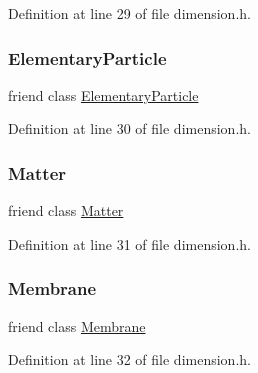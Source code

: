 Definition at line 29 of file dimension.\+h.

\mbox{\label{class_dimension_af2ace341c1d7ccd30de3502502773591}} 
\subsubsection{\texorpdfstring{Elementary\+Particle}{ElementaryParticle}}
{\footnotesize\ttfamily friend class \hyperlink{class_elementary_particle}{Elementary\+Particle}\hspace{0.3cm}{\ttfamily [friend]}}



Definition at line 30 of file dimension.\+h.

\mbox{\label{class_dimension_a01ab5ef28c10ff1c9ed0c618fa044aea}} 
\subsubsection{\texorpdfstring{Matter}{Matter}}
{\footnotesize\ttfamily friend class \hyperlink{class_matter}{Matter}\hspace{0.3cm}{\ttfamily [friend]}}



Definition at line 31 of file dimension.\+h.

\mbox{\label{class_dimension_ac790db405644a01723104c3c0c8128bb}} 
\subsubsection{\texorpdfstring{Membrane}{Membrane}}
{\footnotesize\ttfamily friend class \hyperlink{class_membrane}{Membrane}\hspace{0.3cm}{\ttfamily [friend]}}



Definition at line 32 of file dimension.\+h.

\mbox{\label{class_dimension_a9175d4e959674956ccb487d060bac93f}} 

